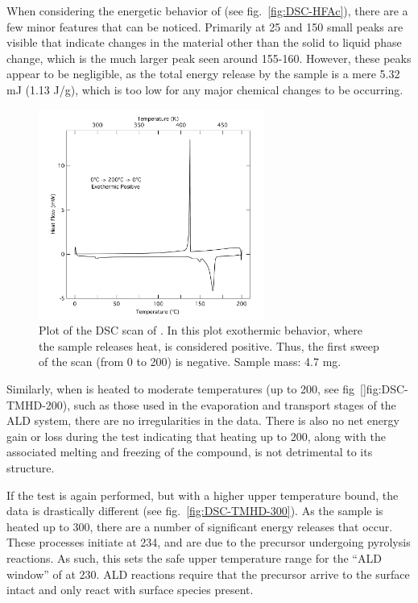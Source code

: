 When considering the energetic behavior of \HFAc{} (see fig.~\vref{fig:DSC-HFAc}), there are a few minor features that can be noticed. Primarily at 25 and 150\degC{} small peaks are visible that indicate changes in the material other than the solid to liquid phase change, which is the much larger peak seen around 155-160\degC{}. However, these peaks appear to be negligible, as the total energy release by the sample is a mere 5.32 mJ (1.13 J/g), which is too low for any major chemical changes to be occurring. 

\begin{figure}[htbp]
	\centering
	\includegraphics[width=0.66\textwidth]{./Figures/Data/Thermal-Analysis/DSC/HFAc}
	\caption[DSC Results of \HFAc{}]%
		{Plot of the DSC scan of \HFAc{}. In this plot exothermic behavior, where the sample releases heat, is %
		considered positive. Thus, the first sweep of the scan (from 0\degC{} to 200\degC{}) is negative. %
		Sample mass: 4.7 mg.}
	\label{fig:DSC-HFAc}
\end{figure}

Similarly, when \TMHD{} is heated to moderate temperatures (up to 200\degC{}, see fig~\vref{}fig:DSC-TMHD-200), such as those used in the evaporation and transport stages of the ALD system, there are no irregularities in the data. There is also no net energy gain or loss during the test indicating that heating up to 200\degC{}, along with the associated melting and freezing of the compound, is not detrimental to its structure. 

If the test is again performed, but with a higher upper temperature bound, the data is drastically different (see fig.~\vref{fig:DSC-TMHD-300}). As the sample is heated up to 300\degC{}, there are a number of significant energy releases that occur. These processes initiate at 234\degC{}, and are due to the precursor undergoing pyrolysis reactions. As such, this sets the safe upper temperature range for the ``ALD window'' of \TMHD{} at 230\degC{}. ALD reactions require that the precursor arrive to the surface intact and only react with surface species present. 

